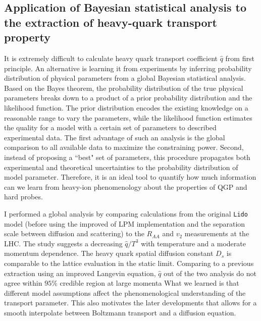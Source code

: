 \documentclass[12pt,a4paper]{article}
\begin{document}
\subsection{Application of Bayesian statistical analysis to the extraction of heavy-quark transport property}
It is extremely difficult to calculate heavy quark transport coefficient $\hat{q}$ from first principle. 
An alternative is learning it from experiments by inferring probability distribution of physical parameters from a global Bayesian statistical analysis.
Based on the Bayes theorem, the probability distribution of the true physical parameters breaks down to a product of a prior probability distribution and the likelihood function.
The prior distribution encodes the existing knowledge on a reasonable range to vary the parameters, while the likelihood function estimates the quality for a model with a certain set of parameters to described experimental data.
The first advantage of such an analysis is the global comparison to all available data to maximize the constraining power.
Second, instead of proposing a ``best" set of parameters, this procedure propagates both experimental and theoretical uncertainties to the probability distribution of model parameter.
Therefore, it is an ideal tool to quantify how much information can we learn from heavy-ion phenomenology about the properties of QGP and hard probes.

I performed a global analysis by comparing calculations from the original {\tt Lido} model (before using the improved of LPM implementation and the separation scale between diffusion and scattering) to the $R_{AA}$ and $v_{2}$ measurements at the LHC. 
The study suggests a decreasing $\hat{q}/T^3$ with temperature and a moderate momentum dependence.
The heavy quark spatial diffusion constant $D_s$ is comparable to the lattice evaluation in the static limit.
Comparing to a previous extraction using an improved Langevin equation, $\hat{q}$ out of the two analysis do not agree within $95\%$ credible region at large momenta
What we learned is that different model assumptions affect the phenomenological understanding of the transport parameter.
This also motivates the later developments that allows for a smooth interpolate between Boltzmann transport and a diffusion equation.
\end{document}
